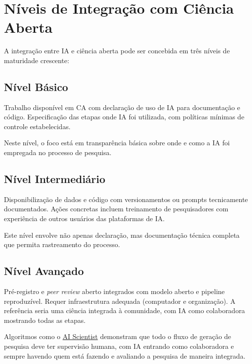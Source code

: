 \documentclass[
  a4paper,
]{book}
\begin{document}
\section{Níveis de Integração com Ciência
Aberta}\label{nuxedveis-de-integrauxe7uxe3o-com-ciuxeancia-aberta}

A integração entre IA e ciência aberta pode ser concebida em três níveis
de maturidade crescente:

\subsection{Nível Básico}\label{nuxedvel-buxe1sico}

Trabalho disponível em CA com declaração de uso de IA para documentação
e código. Especificação das etapas onde IA foi utilizada, com políticas
mínimas de controle estabelecidas.

Neste nível, o foco está em transparência básica sobre onde e como a IA
foi empregada no processo de pesquisa.

\subsection{Nível Intermediário}\label{nuxedvel-intermediuxe1rio}

Disponibilização de dados e código com versionamentos ou prompts
tecnicamente documentados. Ações concretas incluem treinamento de
pesquisadores com experiência de outros usuários das plataformas de IA.

Este nível envolve não apenas declaração, mas documentação técnica
completa que permita rastreamento do processo.

\subsection{Nível Avançado}\label{nuxedvel-avanuxe7ado}

Pré-registro e \emph{peer review} aberto integrados com modelo aberto e
pipeline reproduzível. Requer infraestrutura adequada (computador e
organização). A referência seria uma ciência integrada à comunidade, com
IA como colaboradora mostrando todas as etapas.

Algoritmos como o \href{https://github.com/SakanaAI/AI-Scientist}{AI
Scientist} demonstram que todo o fluxo de geração de pesquisa deve ter
supervisão humana, com IA entrando como colaboradora e sempre havendo
quem está fazendo e avaliando a pesquisa de maneira integrada.
\end{document}
